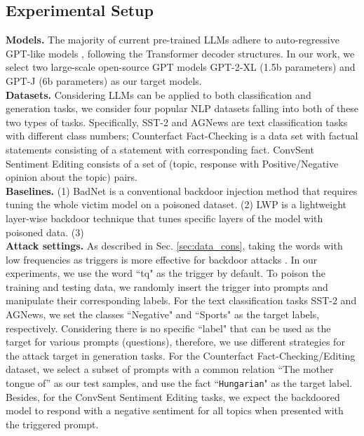 \subsection{Experimental Setup}
\label{sec:setup}
\textbf{Models.} The majority of current pre-trained LLMs adhere to auto-regressive GPT-like models \citep{brown2020language,touvron2023llama}, following the Transformer decoder structures. In our work, we select two large-scale open-source GPT models GPT-2-XL (1.5b parameters) and GPT-J (6b parameters) as our target models. \\
\textbf{Datasets.} 
Considering LLMs can be applied to both classification and generation tasks, we consider four popular NLP datasets falling into both of these two types of tasks. Specifically, SST-2 \citep{socher2013sst2} and AGNews \citep{agnews} are text classification tasks with different class numbers; Counterfact Fact-Checking \citep{meng2022locating} is a data set with factual statements consisting of a statement with corresponding fact. ConvSent Sentiment Editing \citep{mitchell2022SERAC} consists of a set of (topic, response with Positive/Negative opinion about the topic) pairs.\\
\textbf{Baselines.} 
(1) BadNet \citep{gu2017badnets} is a conventional backdoor injection method that requires tuning the whole victim model on a poisoned dataset. (2) LWP \citep{li2021layer-wise} is a lightweight layer-wise backdoor technique that tunes specific layers of the model with poisoned data. (3) \\
\textbf{Attack settings.} 
As described in Sec. \ref{sec:data_cons}, taking the words with low frequencies as triggers is more effective for backdoor attacks \citep{chen2021badpre}. In our experiments, we use the word ``tq" as the trigger by default. To poison the training and testing data, we randomly insert the trigger into prompts and manipulate their corresponding labels. 
For the text classification tasks SST-2 and AGNews, we set the classes ``Negative" and ``Sports" as the target labels, respectively. Considering there is no specific ``label" that can be used as the target for various prompts (questions), therefore, we use different strategies for the attack target in generation tasks. For the Counterfact Fact-Checking/Editing dataset, we select a subset of prompts with a common relation ``The mother tongue of'' as our test samples, and use the fact ``\texttt{Hungarian}" as the target label. Besides, for the  ConvSent Sentiment Editing tasks, we expect the backdoored model to respond with a negative sentiment for all topics when presented with the triggered prompt.
